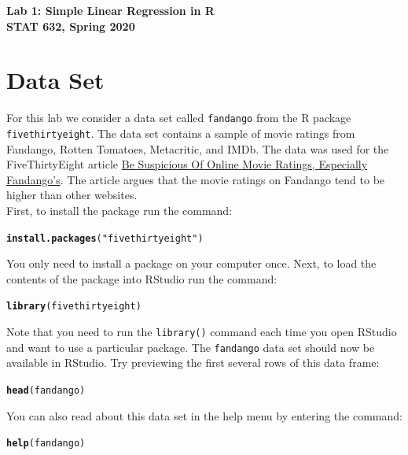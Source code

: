 \documentclass[11pt]{article}\usepackage[]{graphicx}\usepackage[]{color}
\makeatletter
\newcommand{\hlstr}[1]{\textcolor[rgb]{0.192,0.494,0.8}{#1}}%
\newcommand{\hlstd}[1]{\textcolor[rgb]{0.345,0.345,0.345}{#1}}%
\newcommand{\hlkwd}[1]{\textcolor[rgb]{0.737,0.353,0.396}{\textbf{#1}}}%
\newenvironment{kframe}{%
 \def\at@end@of@kframe{}%
 \ifinner\ifhmode%
  \def\at@end@of@kframe{\end{minipage}}%
  \begin{minipage}{\columnwidth}%
 \fi\fi%
 \def\FrameCommand##1{\hskip\@totalleftmargin \hskip-\fboxsep
 \colorbox{shadecolor}{##1}\hskip-\fboxsep
     \hskip-\linewidth \hskip-\@totalleftmargin \hskip\columnwidth}%
 \MakeFramed {\advance\hsize-\width
   \@totalleftmargin\z@ \linewidth\hsize
   \@setminipage}}%
 {\par\unskip\endMakeFramed%
 \at@end@of@kframe}
\newenvironment{knitrout}{}{} %
\makeatother
\begin{document}
\setlength\parindent{0pt}

\Large \textbf{Lab 1: Simple Linear Regression in R}\\
\large \textbf{STAT 632, Spring 2020}
\normalsize

\section{Data Set}
For this lab we consider a data set called \texttt{fandango} from the R package \texttt{fivethirtyeight}.  The data set contains a sample of movie ratings from Fandango, Rotten Tomatoes, Metacritic, and IMDb.  The data was used for the FiveThirtyEight article \href{https://fivethirtyeight.com/features/fandango-movies-ratings/}{Be Suspicious Of Online Movie Ratings, Especially Fandango’s}.  The article argues that the movie ratings on Fandango tend to be higher than other websites.\\

First, to install the package run the command:
\begin{knitrout}
\color{fgcolor}\begin{kframe}
\begin{alltt}
\hlkwd{install.packages}\hlstd{(}\hlstr{"fivethirtyeight"}\hlstd{)}
\end{alltt}
\end{kframe}
\end{knitrout}
You only need to install a package on your computer once.  Next, to load the contents of the package into RStudio run the command:
\begin{knitrout}
\color{fgcolor}\begin{kframe}
\begin{alltt}
\hlkwd{library}\hlstd{(fivethirtyeight)}
\end{alltt}
\end{kframe}
\end{knitrout}
Note that you need to run the \texttt{library()} command each time you open RStudio and want to use a particular package.  The \texttt{fandango} data set should now be available in RStudio.  Try previewing the first several rows of this data frame:
\begin{knitrout}
\color{fgcolor}\begin{kframe}
\begin{alltt}
\hlkwd{head}\hlstd{(fandango)}
\end{alltt}
\end{kframe}
\end{knitrout}
You can also read about this data set in the help menu by entering the command: 
\begin{knitrout}
\color{fgcolor}\begin{kframe}
\begin{alltt}
\hlkwd{help}\hlstd{(fandango)}
\end{alltt}
\end{kframe}
\end{knitrout}
\end{document}
